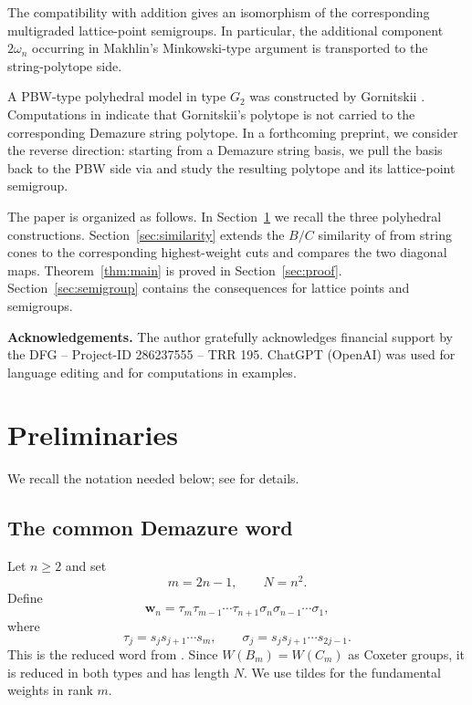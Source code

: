 \documentclass[a4paper, 12pt]{amsart}
\newcommand{\ww}{\mathbf w}
\begin{document}
The compatibility with addition gives an isomorphism of the corresponding multigraded lattice-point semigroups. In particular, the additional component $2\omega_n$ occurring in Makhlin's Minkowski-type argument \cite[Lemma~5.1]{Mak19} is transported to the string-polytope side.

A PBW-type polyhedral model in type $G_2$ was constructed by Gornitskii \cite{Gor15}. Computations in \cite{CFL24} indicate that Gornitskii's polytope is not carried to the corresponding Demazure string polytope. In a forthcoming preprint, we consider the reverse direction: starting from a Demazure string basis, we pull the basis back to the PBW side via \cite{Enu22} and study the resulting polytope and its lattice-point semigroup.

The paper is organized as follows. In Section~\ref{sec:preliminaries} we recall the three polyhedral constructions. Section~\ref{sec:similarity} extends the $B/C$ similarity of \cite{CFL25} from string cones to the corresponding highest-weight cuts and compares the two diagonal maps. Theorem~\ref{thm:main} is proved in Section~\ref{sec:proof}. Section~\ref{sec:semigroup} contains the consequences for lattice points and semigroups.

\medskip
\noindent\textbf{Acknowledgements.} The author gratefully acknowledges financial support by the DFG -- Project-ID 286237555 -- TRR 195. ChatGPT (OpenAI) was used for language editing and for computations in examples.

\section{Preliminaries}\label{sec:preliminaries}

We recall the notation needed below; see \cite{Mak19,CFL24,CFL25} for details.

\subsection{The common Demazure word}

Let $n\geq2$ and set
\[
                           m=2n-1,\qquad N=n^2.
\]
Define
\begin{equation}\label{eq:intro-word}
 \ww_n=\tau_m\tau_{m-1}\cdots\tau_{n+1}
              \sigma_n\sigma_{n-1}\cdots\sigma_1,
\end{equation}
where
\[
 \tau_j=s_js_{j+1}\cdots s_m,
 \qquad
 \sigma_j=s_js_{j+1}\cdots s_{2j-1}.
\]
This is the reduced word from \cite{CFL24}. Since $W(B_m)=W(C_m)$ as Coxeter groups, it is reduced in both types and has length $N$. We use tildes for the fundamental weights in rank $m$.
\end{document}
